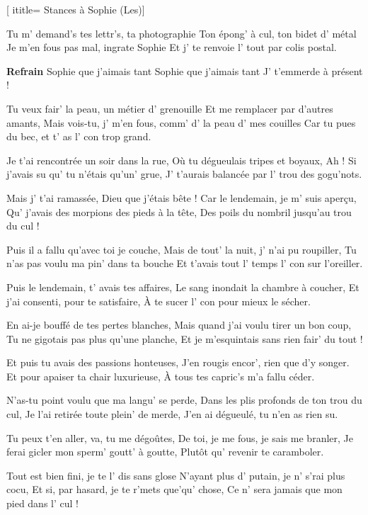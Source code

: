  [
ititle= {Stances à Sophie (Les)}]


\beginverse
Tu m' demand's tes lettr's, ta photographie
Ton épong' à cul, ton bidet d' métal
Je m'en fous pas mal, ingrate Sophie
Et j' te renvoie l' tout par colis postal.
\endverse

\beginchorus
\textbf {Refrain}
Sophie que j'aimais tant
Sophie que j'aimais tant
J' t'emmerde à présent !
\endchorus

\beginverse
Tu veux fair' la peau, un métier d' grenouille
Et me remplacer par d'autres amants,
Mais vois-tu, j' m'en fous, comm' d' la peau d' mes couilles
Car tu pues du bec, et t' as l' con trop grand.
\endverse

\beginverse
Je t'ai rencontrée un soir dans la rue,
Où tu dégueulais tripes et boyaux,
Ah ! Si j'avais su qu' tu n'étais qu'un' grue,
J' t'aurais balancée par l' trou des gogu'nots.
\endverse

\beginverse
Mais j' t'ai ramassée, Dieu que j'étais bête !
Car le lendemain, je m' suis aperçu,
Qu' j'avais des morpions des pieds à la tête,
Des poils du nombril jusqu'au trou du cul !
\endverse

\beginverse
Puis il a fallu qu'avec toi je couche,
Mais de tout' la nuit, j' n'ai pu roupiller,
Tu n'as pas voulu ma pin' dans ta bouche
Et t'avais tout l' temps l' con sur l'oreiller.
\endverse

\beginverse
Puis le lendemain, t' avais tes affaires,
Le sang inondait la chambre à coucher,
Et j'ai consenti, pour te satisfaire,
À te sucer l' con pour mieux le sécher.
\endverse

\beginverse
En ai-je bouffé de tes pertes blanches,
Mais quand j'ai voulu tirer un bon coup,
Tu ne gigotais pas plus qu'une planche,
Et je m'esquintais sans rien fair' du tout !
\endverse

\beginverse
Et puis tu avais des passions honteuses,
J'en rougis encor', rien que d'y songer.
Et pour apaiser ta chair luxurieuse,
À tous tes capric's m'a fallu céder.
\endverse

\beginverse
N'as-tu point voulu que ma langu' se perde,
Dans les plis profonds de ton trou du cul,
Je l'ai retirée toute plein' de merde,
J'en ai dégueulé, tu n'en as rien su.
\endverse

\beginverse
Tu peux t'en aller, va, tu me dégoûtes,
De toi, je me fous, je sais me branler,
Je ferai gicler mon sperm' goutt' à goutte,
Plutôt qu' revenir te caramboler.
\endverse

\beginverse
Tout est bien fini, je te l' dis sans glose
N'ayant plus d' putain, je n' s'rai plus cocu,
Et si, par hasard, je te r'mets que'qu' chose,
Ce n' sera jamais que mon pied dans l' cul !
\endverse

\endsong